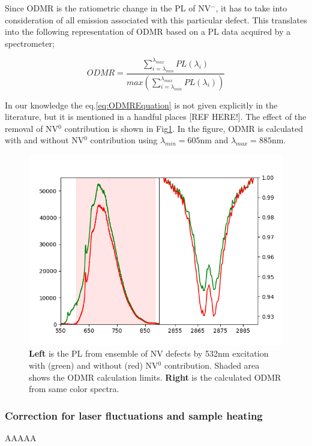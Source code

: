 Since ODMR is the ratiometric change in the PL of NV$^{-}$, it has to take
into consideration of all emission associated with this particular defect.
This translates into the following representation of ODMR based on a PL 
data acquired by a spectrometer;


\begin{equation}
	ODMR = \frac{\sum\limits_{i=\lambda_{min}}^{\lambda_{max}} PL(\lambda_{i})}{max({\sum\limits_{i=\lambda_{min}}^{\lambda_{max}} PL(\lambda_{i})})}
\label{eq:ODMREquation}
\end{equation}

In our knowledge the eq.\ref{eq:ODMREquation} is not given explicitly in 
the literature, but it is mentioned in a handful places [REF HERE!].
The effect of the removal of NV$^{0}$ contribution is shown in
Fig\ref{fig:ODMRBeforeAfterCleanUP}. In the figure, ODMR is calculated 
with and without NV$^{0}$ contribution using $\lambda_{min}=605$nm and 
$\lambda_{max}=885$nm.

\begin{figure}[H]
	\centering
	\includegraphics[angle=0,origin=c,width =
	1.0\linewidth]{Section_ODMR/Figures/ODMRAndCleanedUpODMR.png}
	\caption{\textbf{Left} is the PL from ensemble of NV defects by 532nm
		excitation with (green) and without (red) NV$^{0}$ contribution. 
		Shaded area shows the ODMR calculation limits. \textbf{Right} is the 
		calculated ODMR from same color spectra.}
	\label{fig:ODMRBeforeAfterCleanUP}
\end{figure}

\subsubsection{Correction for laser fluctuations and sample heating}
AAAAA

